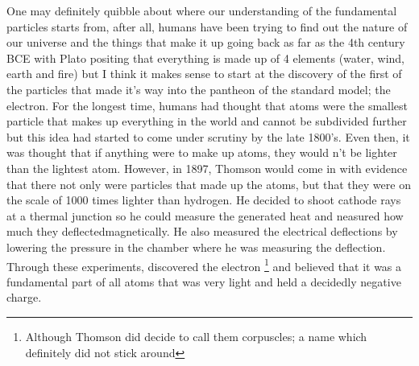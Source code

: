   One may definitely quibble about where our understanding of the fundamental particles starts from, after all, humans have been trying to find out the nature of our universe and the things that make it up going back as far as the 4th century BCE with Plato positing that everything is made up of 4 elements (water, wind, earth and fire)\cite{Timaeus} but I think it makes sense to start at the discovery of the first of the particles that made it's way into the pantheon of the standard model; the electron.
  For the longest time, humans had thought that atoms were the smallest particle that makes up everything in the world and cannot be subdivided further\cite{Dalton} but this idea had started to come under scrutiny by the late 1800's.
  Even then, it was thought that if anything were to make up atoms, they would n't be lighter than the lightest atom.
  However, in 1897, Thomson would come in with evidence that there not only were particles that made up the atoms, but that they were on the scale of 1000 times lighter  than hydrogen.
  He decided to shoot cathode rays at a thermal junction so he could measure the generated heat and neasured how much they deflectedmagnetically.
  He also measured the electrical deflections by lowering the pressure in the chamber where he was measuring the deflection.
  Through these experiments, discovered the electron
  \footnote{Although Thomson did decide to call them corpuscles; a name which definitely did not stick around}
  and believed that it was a fundamental part of all atoms that was very light and held a decidedly negative charge.\cite{electronDiscovery}



  
